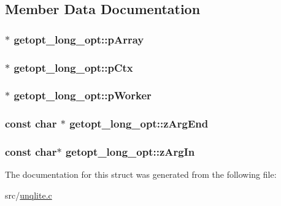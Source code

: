 \subsection{Member Data Documentation}
\hypertarget{structgetopt__long__opt_a97fd021967097a3d8a7fc0b47558daf6}{
\subsubsection[{p\-Array}]{$\ast$ getopt\-\_\-long\-\_\-opt\-::p\-Array}}\label{d0/d31/structgetopt__long__opt_a97fd021967097a3d8a7fc0b47558daf6}
\hypertarget{structgetopt__long__opt_afe6c313e65908b6f7de9dfc1ad802405}{
\subsubsection[{p\-Ctx}]{$\ast$ getopt\-\_\-long\-\_\-opt\-::p\-Ctx}}\label{d0/d31/structgetopt__long__opt_afe6c313e65908b6f7de9dfc1ad802405}
\hypertarget{structgetopt__long__opt_a6b43c3243f7b5aa6967f767a6b28d0b8}{
\subsubsection[{p\-Worker}]{$\ast$ getopt\-\_\-long\-\_\-opt\-::p\-Worker}}\label{d0/d31/structgetopt__long__opt_a6b43c3243f7b5aa6967f767a6b28d0b8}
\hypertarget{structgetopt__long__opt_a2fded382b0b101f0658094a2aa85fb43}{
\subsubsection[{z\-Arg\-End}]{\setlength{\rightskip}{0pt plus 5cm}const char $\ast$ getopt\-\_\-long\-\_\-opt\-::z\-Arg\-End}}\label{d0/d31/structgetopt__long__opt_a2fded382b0b101f0658094a2aa85fb43}
\hypertarget{structgetopt__long__opt_ae27fdfdee6eee6ea7d184572bfcf2713}{
\subsubsection[{z\-Arg\-In}]{\setlength{\rightskip}{0pt plus 5cm}const char$\ast$ getopt\-\_\-long\-\_\-opt\-::z\-Arg\-In}}\label{d0/d31/structgetopt__long__opt_ae27fdfdee6eee6ea7d184572bfcf2713}


The documentation for this struct was generated from the following file\-:\begin{DoxyCompactItemize}
\item 
src/\hyperlink{unqlite_8c}{unqlite.\-c}\end{DoxyCompactItemize}
